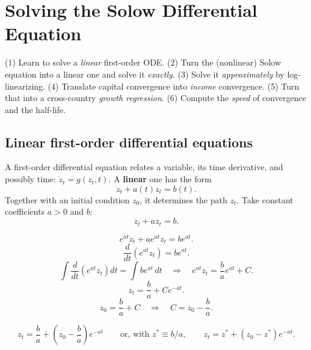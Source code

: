 \documentclass[11pt]{article}
\begin{document}
\section{Solving the Solow Differential Equation}\label{sec:ode}

\begin{recap}
(1) Learn to solve a \emph{linear} first-order ODE. \;
(2) Turn the (nonlinear) Solow equation into a linear one and solve it \emph{exactly}. \;
(3) Solve it \emph{approximately} by log-linearizing. \;
(4) Translate capital convergence into \emph{income} convergence. \;
(5) Turn that into a cross-country \emph{growth regression}. \;
(6) Compute the \emph{speed} of convergence and the half-life.
\end{recap}

\subsection{Linear first-order differential equations}
A first-order differential equation relates a variable, its time derivative, and possibly time: $\dot z_t = g(z_t, t)$. A \textbf{linear} one has the form
\[
\dot z_t + a(t)z_t = b(t).
\]
Together with an initial condition $z_0$, it determines the path $z_t$. Take constant coefficients $a > 0$ and $b$:
\[
\dot z_t + az_t = b.
\]

\[ e^{at}\dot z_t + ae^{at}z_t = be^{at}. \]
\[ \frac{d}{dt}\left(e^{at}z_t\right) = be^{at}. \]
\[ \int\frac{d}{dt}\left(e^{at}z_t\right)dt = \int be^{at}\,dt \quad\Longrightarrow\quad e^{at}z_t = \frac{b}{a}e^{at} + C. \]
\[ z_t = \frac{b}{a} + Ce^{-at}. \]
\[ z_0 = \frac{b}{a} + C \quad\Longrightarrow\quad C = z_0 - \frac{b}{a}. \]

\begin{keyresult}[Solution of $\dot z_t + az_t = b$]
\[
z_t = \frac{b}{a} + \left(z_0 - \frac{b}{a}\right)e^{-at} \qquad\text{or, with } z^* \equiv b/a, \qquad z_t = z^* + (z_0 - z^*)e^{-at}.
\]
\end{keyresult}
\end{document}
